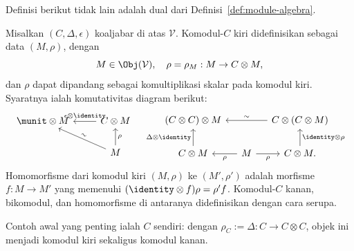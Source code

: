 Definisi berikut tidak lain adalah dual dari
Definisi~\ref{def:module-algebra}.

\begin{definition}[Komodul]\label{def:comodule-cogebra}
	Misalkan $(C,\Delta,\epsilon)$ koaljabar di atas $\mathcal{V}$. Komodul-$C$
	kiri didefinisikan sebagai data $(M,\rho)$, dengan
	\[ M \in \Obj(\mathcal{V}), \quad \rho = \rho_M : M \to C \otimes M, \]
	dan $\rho$ dapat dipandang sebagai komultiplikasi skalar pada komodul kiri.
	Syaratnya ialah komutativitas diagram berikut:
	\[\begin{tikzcd}
		\munit \otimes M & C \otimes M \arrow[l, "{\epsilon \otimes \identity}"'] \\
		& M \arrow[u, "{\rho}"'] \arrow[lu, "\sim" sloped]
	\end{tikzcd} \quad \begin{tikzcd}[column sep=small]
		(C \otimes C) \otimes M & & C \otimes (C \otimes M) \arrow[ll, "\sim"'] \\
		C \otimes M \arrow[u, "{\Delta \otimes \identity}"] & M \arrow[l, "{\rho}"] \arrow[r, "{\rho}"'] & C \otimes M. \arrow[u, "{\identity \otimes \rho}"']
	\end{tikzcd}\]
	Homomorfisme dari komodul kiri $(M,\rho)$ ke $(M',\rho')$ adalah morfisme
	$f:M\to M'$ yang memenuhi
	$(\identity\otimes f)\rho=\rho'f$. Komodul-$C$ kanan, bikomodul, dan
	homomorfisme di antaranya didefinisikan dengan cara serupa.
\end{definition}

Contoh awal yang penting ialah $C$ sendiri: dengan
$\rho_C:=\Delta:C\to C\otimes C$, objek ini menjadi komodul kiri sekaligus
komodul kanan.

